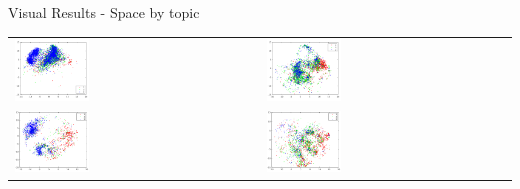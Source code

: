 \documentclass[usenames,dvipsnames]{beamer}
\begin{document}
\begin{frame}{Visual Results - Space by topic}
\vspace{-0.45cm}
\begin{table}[]
\begin{tabular}{ll}
 \includegraphics[width=0.31\textwidth]{imagenes/cluster3.png}& \includegraphics[width=0.31\textwidth]{imagenes/cluster4.png} \\
\includegraphics[width=0.31\textwidth]{imagenes/cluster8.png} & \includegraphics[width=0.31\textwidth]{imagenes/clustes7.png}
\end{tabular}
\end{table}

\end{frame}
%
%
\end{document}
